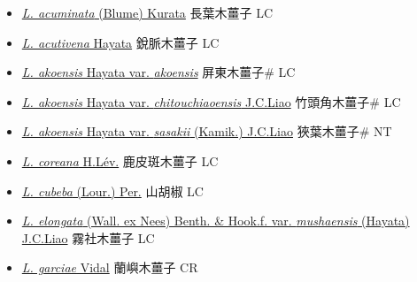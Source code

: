 \begin{itemize}
  \begin{itemize}
        \item[] \href{http://www.theplantlist.org/tpl1.1/search?q=Litsea+acuminata}{\textit{L. acuminata} (Blume) Kurata}   長葉木薑子 LC
        \item[] \href{http://www.theplantlist.org/tpl1.1/search?q=Litsea+acutivena}{\textit{L. acutivena} Hayata}   銳脈木薑子 LC
        \item[] \href{http://www.theplantlist.org/tpl1.1/search?q=Litsea+akoensis+var.+akoensis}{\textit{L. akoensis} Hayata var. \textit{akoensis}}   屏東木薑子\# LC
        \item[] \href{http://www.theplantlist.org/tpl1.1/search?q=Litsea+akoensis+var.+chitouchiaoensis}{\textit{L. akoensis} Hayata var. \textit{chitouchiaoensis} J.C.Liao}   竹頭角木薑子\# LC
        \item[] \href{http://www.theplantlist.org/tpl1.1/search?q=Litsea+akoensis+var.+sasakii}{\textit{L. akoensis} Hayata var. \textit{sasakii} (Kamik.) J.C.Liao}   狹葉木薑子\# NT
        \item[] \href{http://www.theplantlist.org/tpl1.1/search?q=Litsea+coreana}{\textit{L. coreana} H.Lév.}   鹿皮斑木薑子 LC
        \item[] \href{http://www.theplantlist.org/tpl1.1/search?q=Litsea+cubeba}{\textit{L. cubeba} (Lour.) Per.}   山胡椒 LC
        \item[] \href{http://www.theplantlist.org/tpl1.1/search?q=Litsea+elongata+var.+mushaensis}{\textit{L. elongata} (Wall. ex Nees) Benth. \& Hook.f. var. \textit{mushaensis} (Hayata) J.C.Liao}   霧社木薑子 LC
        \item[] \href{http://www.theplantlist.org/tpl1.1/search?q=Litsea+garciae}{\textit{L. garciae} Vidal}   蘭嶼木薑子 CR

\end{itemize}
\end{itemize}
